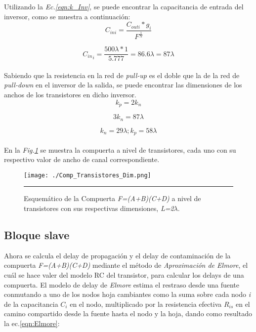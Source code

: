\documentclass[12pt,a4paper]{article} %
\begin{document}
Utilizando la \textit{Ec.\ref{eqn:k_Inv}}, se puede encontrar la capacitancia de entrada del inversor, como se muestra a continuación:\\

\begin{equation}\label{eqn:k_Inv}
C_{ini}= \frac{C_{outi}*g_{i}}{F^{\frac{1}{N}}}
\end{equation}

\begin{equation}\label{eqn:k_Inv2}
{C_{in}}_{i}= \frac{500\lambda*1}{5.777} = 86.6\lambda = 87\lambda
\end{equation}\\

Sabiendo que la resistencia en la red de \textit{pull-up} es el doble que la de la red de \textit{pull-down} en el inversor de la salida, se puede encontrar las dimensiones de los anchos de los transistores en dicho inversor.\\

\begin{equation}\label{eqn:k_Inv3}
k_p=2k_n
\end{equation}

\begin{equation}\label{eqn:k_Inv4}
3k_n=87\lambda
\end{equation}

\begin{equation}\label{eqn:k_Inv5}
k_n=29\lambda ; k_p=58\lambda 
\end{equation}\\

En la \textit{Fig.\ref{fig:Comp_Transistores_Dim}} se muestra la compuerta a nivel de transistores, cada uno con su respectivo valor de ancho de canal correspondiente.\\

\begin{figure}[htbp]
  \centering
    \texttt{[image: ./Comp\_Transistores\_Dim.png]}
    \rule{35em}{0.5pt}
  \caption[Delay]{Esquemático de la Compuerta \textit{F=(A+B)(C+D)} a nivel de transistores con sus respectivas dimensiones, \textit{L=2$\lambda$}.}
  \label{fig:Comp_Transistores_Dim}
\end{figure}

\subsection{Bloque slave}

Ahora se calcula el delay de propagación y el delay de contaminación de la compuerta \textit{F=(A+B)(C+D)} mediante el método de \textit{Aproximación de Elmore}, el cuál se hace valer del modelo RC del transistor, para calcular los delays de una compuerta. El modelo de delay de \textit{Elmore} estima el restraso desde una fuente conmutando a uno de los nodos hoja cambiantes como la suma sobre cada nodo \textit{i} de la capacitancia \textit{$C_{i}$} en el nodo, multiplicado por la resistencia efectiva \textit{$R_{is}$} en el camino compartido desde la fuente hasta el nodo y la hoja, dando como resultado la ec.\ref{eqn:Elmore}:
\end{document}

